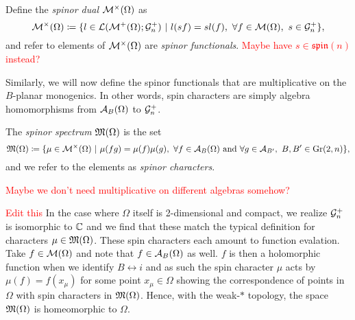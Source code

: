 \begin{definition}
    Define the \emph{spinor dual} $\mathcal{M}^\times(\Omega)$ as
    \[
        \mathcal{M}^\times(\Omega) \coloneqq \{ l \in \mathcal{L}(\mathcal{M}^+(\Omega); \mathcal{G}_n^+) ~\vert~ l(sf) = sl(f), ~\forall f \in \mathcal{M}(\Omega), ~s \in \mathcal{G}_n^+ \},
    \]
    and refer to elements of $\mathcal{M}^\times(\Omega)$ are \emph{spinor functionals}. \textcolor{red}{Maybe have $s\in \mathfrak{spin}(n)$ instead?}
\end{definition}
Similarly, we will now define the spinor functionals that are multiplicative on the $B$-planar monogenics. In other words, spin characters are simply algebra homomorphisms from $\mathcal{A}_{B}(\Omega)$ to $\mathcal{G}_n^+$.
\begin{definition}
    The \emph{spinor spectrum} $\mathfrak{M}(\Omega)$ is the set
    \[
        \mathfrak{M}(\Omega) \coloneqq \{ \mu \in \mathcal{M}^\times(\Omega) ~\vert~ \mu(fg) = \mu(f)\mu(g),~ \forall f \in \mathcal{A}_{B}(\Omega) \textrm{ and } \forall g \in \mathcal{A}_{B'}, ~ B,B' \in \operatorname{Gr}(2,n)\},
    \]
    and we refer to the elements as \emph{spinor characters}.
\end{definition}
\textcolor{red}{Maybe we don't need multiplicative on different algebras somehow?}
\begin{example}
\textcolor{red}{Edit this}
In the case where $\Omega$ itself is 2-dimensional and compact, we realize $\mathcal{G}_n^+$ is isomorphic to $\mathbb{C}$ and we find that these match the typical definition for characters $\mu\in \mathfrak{M}(\Omega)$.  These spin characters each amount to function evalation. Take $f\in \mathcal{M}(\Omega)$ and note that $f \in \mathcal{A}_{B}(\Omega)$ as well.  $f$ is then a holomorphic function when we identify $B \leftrightarrow i$ and as such the spin character $\mu$ acts by $\mu(f)=f(x_\mu)$ for some point $x_\mu \in \Omega$ showing the correspondence of points in $\Omega$ with spin characters in $\mathfrak{M}(\Omega)$. Hence, with the weak-$\ast$ topology, the space $\mathfrak{M}(\Omega)$ is homeomorphic to $\Omega$. 
\end{example}

